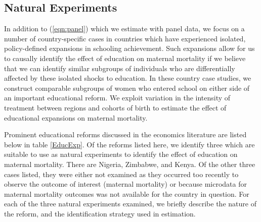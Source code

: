 \documentclass{article}[12pt,subeqn]
\begin{document}
\begin{spacing}{1.4}
\subsection{Natural Experiments}
\label{scn:empiricalexperiment}
In addition to (\ref{eqn:panel}) which we estimate with panel data, we focus on a number of country-specific 
cases in countries which have experienced isolated, policy-defined expansions in schooling achievement. Such 
expansions allow for us to causally identify the effect of education on maternal mortality if we believe that 
we can identify similar subgroups of individuals who are differentially affected by these isolated shocks to 
education. In these country case studies, we construct comparable subgroups of women who entered school on 
either side of an important educational reform.  We exploit variation in the intensity of treatment between 
regions and cohorts of birth to estimate the effect of educational expansions on maternal mortality.

Prominent educational reforms discussed in the economics literature are listed below in table \ref{EducExp}.  
Of the reforms listed here, we identify three which are suitable to use as natural experiments to identify
the effect of education on maternal mortality.  There are Nigeria, Zimbabwe, and Kenya.  Of the other three
cases listed, they were either not examined as they occurred too recently to observe the outcome of interest 
(maternal mortality) or because microdata for maternal mortality outcomes was not available for the country 
in question.  For each of the three natural experiments examined, we briefly describe the nature of the reform, 
and the identification strategy used in estimation.


\end{spacing}
\end{document}
